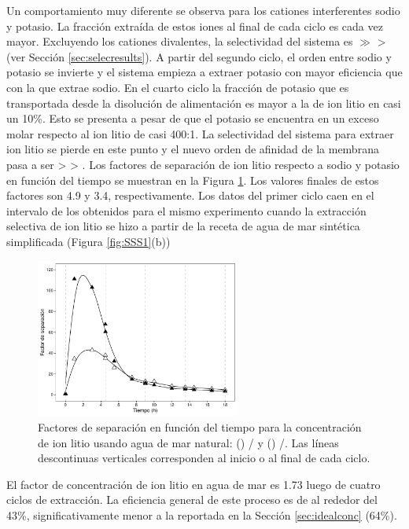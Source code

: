 Un comportamiento muy diferente se observa para los cationes interferentes sodio y potasio. La fracción extraída de estos iones al final de cada ciclo es cada vez mayor. Excluyendo los cationes divalentes, la selectividad del sistema es  $\gg$  >  (ver Sección \ref{sec:selecresults}). A partir del segundo ciclo, el orden entre sodio y potasio se invierte y el sistema empieza a extraer potasio con mayor eficiencia que con la que extrae sodio. En el cuarto ciclo la fracción de potasio que es transportada desde la disolución de alimentación es mayor a la de ion litio en casi un 10\%. Esto se presenta a pesar de que el potasio se encuentra en un exceso molar respecto al ion litio de casi 400:1. La selectividad del sistema para extraer ion litio se pierde en este punto y el nuevo orden de afinidad de la membrana pasa a ser  >  > . Los factores de separación de ion litio respecto a sodio y potasio en función del tiempo se muestran en la Figura \ref{fig:SWselec}. Los valores finales de estos factores son 4.9 y 3.4, respectivamente. Los datos del primer ciclo caen en el intervalo de los obtenidos para el mismo experimento cuando la extracción selectiva de ion litio se hizo a partir de la receta de agua de mar sintética simplificada (Figura \ref{fig:SSS1}(b))

\begin{figure}[H]
    \centering
    \includegraphics[width=0.6\textwidth, trim = {0cm 0cm 0 0}, clip]{chap5/figures/SW_Sep.pdf}
    \caption[Factor de separación de ion litio frente a sodio y potasio usando agua de mar natural.]{Factores de separación en función del tiempo para la concentración de ion litio usando agua de mar natural: (\protect\triangleupblck) / y (\protect\triangleupwht) /. Las líneas descontinuas verticales corresponden al inicio o al final de cada ciclo.}
    \label{fig:SWselec}
\end{figure}

El factor de concentración de ion litio en agua de mar es 1.73 luego de cuatro ciclos de extracción. La eficiencia general de este proceso es de al rededor del 43\%, significativamente menor a la reportada en la Sección \ref{sec:idealconc} (64\%).


